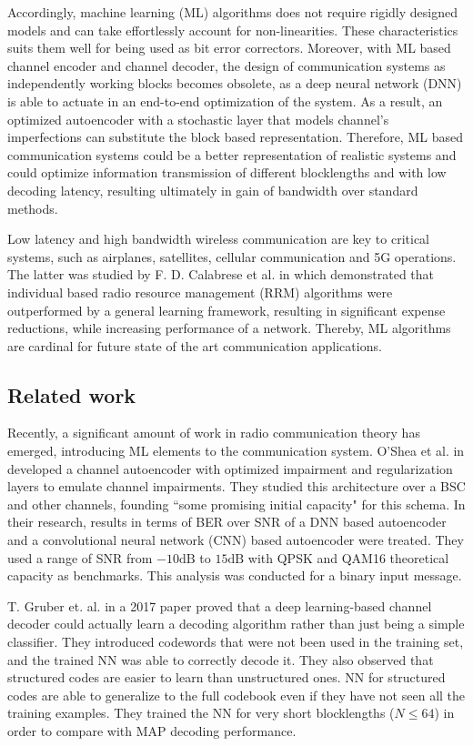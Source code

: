 \documentclass[conference]{IEEEtran}
\begin{document}
Accordingly, machine learning (ML) algorithms does not require rigidly designed models and can take effortlessly account for non-linearities. These characteristics suits them well for being used as bit error correctors. Moreover, with ML based channel encoder and channel decoder, the design of communication systems as independently working blocks becomes obsolete, as a deep neural network (DNN) is able to actuate in an end-to-end optimization of the system. As a result, an optimized autoencoder with a stochastic layer that models channel's imperfections can substitute the block based representation. Therefore, ML based communication systems could be a better representation of realistic systems and could optimize information transmission of different blocklengths and with low decoding latency, resulting ultimately in gain of bandwidth over standard methods. 

Low latency and high bandwidth wireless communication are key to critical systems, such as airplanes, satellites, cellular communication and 5G operations. The latter was studied by F. D. Calabrese et al. in \cite{b3} which  demonstrated that individual based radio resource management (RRM) algorithms were outperformed by a general learning framework, resulting in significant expense reductions, while increasing performance of a network. Thereby, ML algorithms are cardinal for future state of the art communication applications.
  
\subsection{Related work}

Recently, a significant amount of work in radio communication theory has emerged, introducing ML elements to the communication system. O'Shea et al. in \cite{osheaautoencoder} developed a channel autoencoder with optimized impairment and regularization layers to emulate channel impairments. They studied this architecture over a BSC and other channels, founding ``some promising initial capacity" for this schema. In their research, results in terms of BER over SNR of a DNN based autoencoder and a convolutional neural network (CNN) based autoencoder were treated. They used a range of SNR from $-10\text{dB}$ to $15\text{dB}$ with QPSK and QAM16 theoretical capacity as benchmarks. This analysis was conducted for a binary input message.

    
T. Gruber et. al. in a 2017 paper \cite{2018} proved that a deep learning-based channel decoder could actually learn a decoding algorithm rather than just being a simple classifier. They introduced codewords that were not been used in the training set, and the trained NN was able to correctly decode it. They also observed that structured codes are easier to learn than unstructured ones. NN for structured codes are able to generalize to the full codebook even if they have not seen all the training examples. They trained the NN for very short blocklengths ($N \leq 64$) in order to compare with MAP decoding performance.
\end{document}
